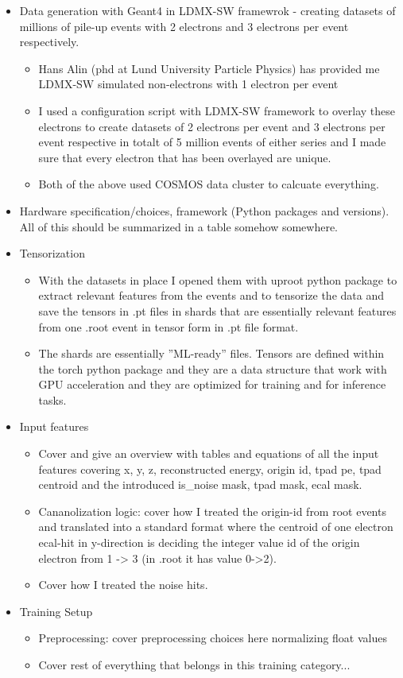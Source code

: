 \begin{itemize}
    
    \item Data generation with Geant4 in LDMX-SW framewrok - creating datasets of millions of pile-up events with 2 electrons and 3 electrons per event respectively.
    \begin{itemize}
        \item Hans Alin (phd at Lund University Particle Physics) has provided me LDMX-SW simulated non-electrons with 1 electron per event
        \item I used a configuration script with LDMX-SW framework to overlay these electrons to create datasets of 2 electrons per event and 3 electrons per event respective in totalt of 5 million events of either series and I made sure that every electron that has been overlayed are unique. 
        \item Both of the above used COSMOS data cluster to calcuate everything. 
    \end{itemize}
    \item Hardware specification/choices, framework (Python packages and versions). All of this should be summarized in a table somehow somewhere. 
    \item Tensorization
    \begin{itemize}
        \item With the datasets in place I opened them with uproot python package to extract relevant features from the events and to tensorize the data and save the tensors in .pt files in shards that are essentially relevant features from one .root event in tensor form in .pt file format. 
        \item The shards are essentially ''ML-ready'' files. Tensors are defined within the torch python package and they are a data structure that work with GPU acceleration and they are optimized for training and for inference tasks. 
    \end{itemize}
    \item Input features
    \begin{itemize}
        \item Cover and give an overview with tables and equations of all the input features covering x, y, z, reconstructed energy, origin id, tpad pe, tpad centroid and the introduced is\_noise mask, tpad mask, ecal mask. 
        \item Cananolization logic: cover how I treated the origin-id from root events and translated into a standard format where the centroid of one electron ecal-hit in y-direction is deciding the integer value id of the origin electron from 1 -> 3 (in .root it has value 0->2).
        \item Cover how I treated the noise hits. 
    \end{itemize}
    \item Training Setup
    \begin{itemize}
        \item Preprocessing: cover preprocessing choices here normalizing float values
        \item Cover rest of everything that belongs in this training category...
    \end{itemize}
    

\end{itemize}
